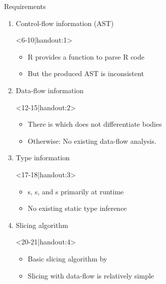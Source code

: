 \begin{frame}[c,fragile]{Requirements}%
\vspace*{2mm}\begin{enumerate}
   \itemsep12pt
   \item<2-> Control-flow information (AST) \begin{onlyenv}<6-10|handout:1>
         \begin{itemize}
         \item<6-> R provides a  function to parse R code
         \item<7-> But the produced AST is inconsistent
      \end{itemize}
   \end{onlyenv}
   \item<3-> Data-flow information \begin{onlyenv}<12-15|handout:2>
      \begin{itemize}
      \item<12-> There is \textsuperscript{\color{gray}\cite{lang_codedepends_2018}} which does not differentiate bodies
      \item<13-> Otherwise: No existing data-flow analysis.
   \end{itemize}
\end{onlyenv}
   \item<4-> Type information \begin{onlyenv}<17-18|handout:3>
      \begin{itemize}
      \item<17-> s, s, and s primarily at runtime
      \item<18-> No existing static type inference
   \end{itemize}
\end{onlyenv}
   \item<5-> Slicing algorithm \begin{onlyenv}<20-21|handout:4>
      \begin{itemize}
      \item<20-> Basic slicing algorithm by \citeauthor{weiser_program_1984}\textsuperscript{\color{gray}\cite{weiser_program_1984}}%
      \item<21-> Slicing with data-flow is relatively simple
   \end{itemize}

\end{onlyenv}
\end{enumerate}
\end{frame}

